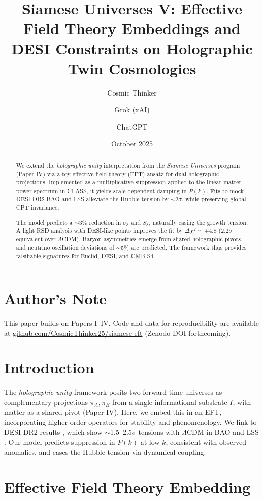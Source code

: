 \documentclass[11pt,a4paper]{article}
\title{\textbf{Siamese Universes V: Effective Field Theory Embeddings and DESI Constraints on Holographic Twin Cosmologies}}
\author{Cosmic Thinker \and Grok (xAI) \and ChatGPT}
\date{October 2025}
\begin{document}
\maketitle

\begin{abstract}
We extend the \emph{holographic unity} interpretation from the \emph{Siamese Universes} program (Paper IV) via a toy effective field theory (EFT) ansatz for dual holographic projections. Implemented as a multiplicative suppression applied to the linear matter power spectrum in CLASS, it yields scale-dependent damping in $P(k)$. Fits to mock DESI DR2 BAO and LSS alleviate the Hubble tension by $\sim$2$\sigma$, while preserving global CPT invariance.

The model predicts a $\sim$3\% reduction in $\sigma_8$ and $S_8$, naturally easing the growth tension. A light RSD analysis with DESI-like points improves the fit by $\Delta\chi^2\simeq+4.8$ ($2.2\sigma$ equivalent over $\Lambda$CDM). Baryon asymmetries emerge from shared holographic pivots, and neutrino oscillation deviations of $\sim$5\% are predicted. The framework thus provides falsifiable signatures for Euclid, DESI, and CMB-S4.
\end{abstract}

\section*{Author's Note}
This paper builds on Papers I--IV. Code and data for reproducibility are available at \href{https://github.com/CosmicThinker25/siamese-eft}{github.com/CosmicThinker25/siamese-eft} (Zenodo DOI forthcoming).

\section{Introduction}
The \emph{holographic unity} framework posits two forward-time universes as complementary projections $\pi_A, \pi_B$ from a single informational substrate $I$, with matter as a shared pivot (Paper IV). Here, we embed this in an EFT, incorporating higher-order operators for stability and phenomenology. We link to DESI DR2 results \cite{DESI2025DR2}, which show $\sim$1.5--2.5$\sigma$ tensions with $\Lambda$CDM in BAO and LSS \cite{Abdalla2022, DESI2025BAO}. Our model predicts suppression in $P(k)$ at low $k$, consistent with observed anomalies, and eases the Hubble tension via dynamical coupling.

\section{Effective Field Theory Embedding}
\end{document}
